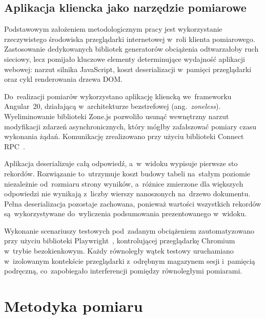 \subsection{Aplikacja kliencka jako narzędzie pomiarowe}
\label{subsec:AparaturaPomiarowa}

Podstawowym założeniem metodologicznym pracy jest wykorzystanie rzeczywistego środowiska przeglądarki internetowej w~roli klienta pomiarowego. Zastosowanie dedykowanych bibliotek generatorów obciążenia odtwarzałoby ruch sieciowy, lecz pomijało kluczowe elementy determinujące wydajność aplikacji webowej: narzut silnika JavaScript, koszt deserializacji w~pamięci przeglądarki oraz cykl renderowania drzewa DOM.

Do~realizacji pomiarów wykorzystano aplikację kliencką we~frameworku Angular~20, działającą w~architekturze bezstrefowej (ang.\ \textit{zoneless}). Wyeliminowanie biblioteki Zone.js pozwoliło usunąć wewnętrzny narzut modyfikacji zdarzeń asynchronicznych, który mógłby zafałszować pomiary czasu wykonania żądań. Komunikację zrealizowano przy użyciu biblioteki Connect RPC~\cite{bib:ConnectRPC}.

Aplikacja deserializuje całą odpowiedź, a~w~widoku wypisuje pierwsze sto rekordów. Rozwiązanie to~utrzymuje koszt budowy tabeli na~stałym poziomie niezależnie od~rozmiaru strony wyników, a~różnice zmierzone dla większych odpowiedzi nie wynikają z~liczby wierszy nanoszonych na~drzewo dokumentu. Pełna deserializacja pozostaje zachowana, ponieważ wartości wszystkich rekordów są~wykorzystywane do~wyliczenia podsumowania prezentowanego w~widoku.

Wykonanie scenariuszy testowych pod~zadanym obciążeniem zautomatyzowano przy użyciu biblioteki Playwright~\cite{bib:Playwright}, kontrolującej przeglądarkę Chromium w~trybie bezokienkowym. Każdy równoległy wątek testowy uruchamiano w~izolowanym kontekście przeglądarki z~odrębnym magazynem sesji i~pamięcią podręczną, co~zapobiegało interferencji pomiędzy równoległymi pomiarami.

\section{Metodyka pomiaru}
\label{sec:MetodykaPomiaru}

